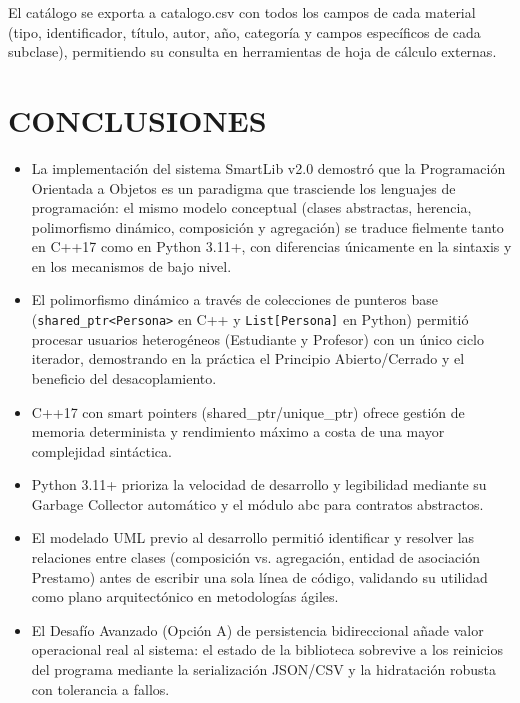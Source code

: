\documentclass[12pt,a4paper]{article}
\begin{document}
El catálogo se exporta a catalogo.csv con todos los campos de cada material (tipo, identificador, título, autor, año, categoría y campos específicos de cada subclase), permitiendo su consulta en herramientas de hoja de cálculo externas.

\section{CONCLUSIONES}
\begin{itemize}
    \item La implementación del sistema SmartLib v2.0 demostró que la Programación Orientada a Objetos es un paradigma que trasciende los lenguajes de programación: el mismo modelo conceptual (clases abstractas, herencia, polimorfismo dinámico, composición y agregación) se traduce fielmente tanto en C++17 como en Python 3.11+, con diferencias únicamente en la sintaxis y en los mecanismos de bajo nivel.
    \item El polimorfismo dinámico a través de colecciones de punteros base (\texttt{shared\_ptr<Persona>} en C++ y \texttt{List[Persona]} en Python) permitió procesar usuarios heterogéneos (Estudiante y Profesor) con un único ciclo iterador, demostrando en la práctica el Principio Abierto/Cerrado y el beneficio del desacoplamiento.
    \item C++17 con smart pointers (shared\_ptr/unique\_ptr) ofrece gestión de memoria determinista y rendimiento máximo a costa de una mayor complejidad sintáctica.
    \item Python 3.11+ prioriza la velocidad de desarrollo y legibilidad mediante su Garbage Collector automático y el módulo abc para contratos abstractos.
    \item El modelado UML previo al desarrollo permitió identificar y resolver las relaciones entre clases (composición vs. agregación, entidad de asociación Prestamo) antes de escribir una sola línea de código, validando su utilidad como plano arquitectónico en metodologías ágiles.
    \item El Desafío Avanzado (Opción A) de persistencia bidireccional añade valor operacional real al sistema: el estado de la biblioteca sobrevive a los reinicios del programa mediante la serialización JSON/CSV y la hidratación robusta con tolerancia a fallos.
\end{itemize}
\end{document}
